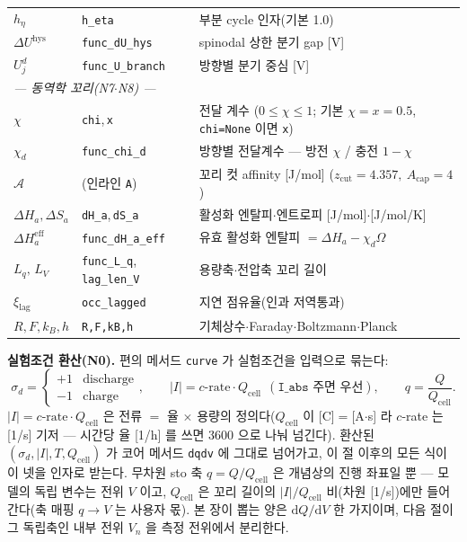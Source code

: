 \documentclass[11pt,a4paper]{article}
\newcommand{\dd}{\mathrm{d}}
\newcommand{\eff}{\mathrm{eff}}
\newcommand{\cell}{\mathrm{cell}}
\newcommand{\hys}{\mathrm{hys}}
\newcommand{\lagg}{\mathrm{lag}}
\newcommand{\sgn}{\sigma_d}
\begin{document}
\begin{longtable}{p{} p{} p{}}
$h_\eta$ & \texttt{h\_eta} & 부분 cycle 인자(기본 1.0) \\
$\Delta U^\hys$ & \texttt{func\_dU\_hys} & spinodal 상한 분기 gap [V] \\
$U_j^d$ & \texttt{func\_U\_branch} & 방향별 분기 중심 [V] \\
\multicolumn{3}{l}{\emph{— 동역학 꼬리(N7$\cdot$N8) —}}\\
$\chi$ & \texttt{chi},\,\texttt{x} & 전달 계수 ($0\le\chi\le1$; 기본 $\chi=x=0.5$, \texttt{chi=None} 이면 \texttt{x}) \\
$\chi_d$ & \texttt{func\_chi\_d} & 방향별 전달계수 — 방전 $\chi$ / 충전 $1-\chi$ \\
$\mathcal A$ & (인라인 \texttt{A}) & 꼬리 컷 affinity [J/mol] ($z_{\mathrm{cut}}=4.357,\ A_{\mathrm{cap}}=4$) \\
$\Delta H_a,\Delta S_a$ & \texttt{dH\_a},\,\texttt{dS\_a} & 활성화 엔탈피$\cdot$엔트로피 [J/mol]$\cdot$[J/mol/K] \\
$\Delta H_a^\eff$ & \texttt{func\_dH\_a\_eff} & 유효 활성화 엔탈피 $=\Delta H_a-\chi_d\Omega$ \\
$L_q,\,L_V$ & \texttt{func\_L\_q},\,\texttt{lag\_len\_V} & 용량축$\cdot$전압축 꼬리 길이 \\
$\xi_{\lagg}$ & \texttt{occ\_lagged} & 지연 점유율(인과 저역통과) \\
$R,F,k_B,h$ & \texttt{R,F,kB,h} & 기체상수$\cdot$Faraday$\cdot$Boltzmann$\cdot$Planck \\
\bottomrule
\end{longtable}

\textbf{실험조건 환산(N0).} 편의 메서드 \texttt{curve} 가 실험조건을 입력으로 묶는다:
\begin{equation}
\sgn=\begin{cases}+1 & \text{discharge}\\-1 & \text{charge}\end{cases},\qquad
|I|=c\text{-rate}\cdot Q_\cell\ \ (\texttt{I\_abs} \text{ 주면 우선}),\qquad
q=\frac{Q}{Q_\cell}.
\label{eq:setup}
\end{equation}
$|I|=c\text{-rate}\cdot Q_\cell$ 은 전류 $=$ 율 $\times$ 용량의 정의다($Q_\cell$ 이 [C]$=$[A$\cdot$s] 라 $c$-rate 는 [1/s] 기저 — 시간당 율 [1/h] 를 쓰면 $3600$ 으로 나눠 넘긴다). 환산된 $(\sgn,|I|,T,Q_\cell)$ 가 코어 메서드 \texttt{dqdv} 에 그대로 넘어가고, 이 절 이후의 모든 식이 이 넷을 인자로 받는다. 무차원 sto 축 $q=Q/Q_\cell$ 은 개념상의 진행 좌표일 뿐 — 모델의 독립 변수는 전위 $V$ 이고, $Q_\cell$ 은 꼬리 길이의 $|I|/Q_\cell$ 비(차원 [1/s])에만 들어간다(축 매핑 $q\!\to\!V$ 는 사용자 몫). 본 장이 뽑는 양은 $\dd Q/\dd V$ 한 가지이며, 다음 절이 그 독립축인 내부 전위 $V_n$ 을 측정 전위에서 분리한다.
\end{document}
